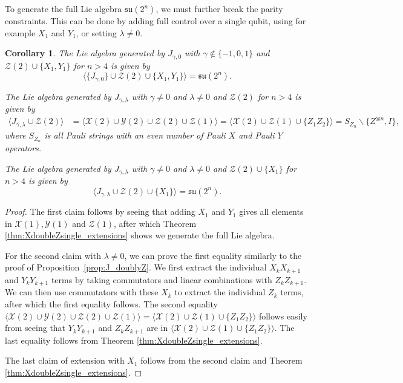 \documentclass[12pt, a4-paper]{amsart}
\newcommand{\cX}{\mathcal{X}}
\newcommand{\cY}{\mathcal{Y}}
\newcommand{\cZ}{\mathcal{Z}}
\numberwithin{equation}{section}
\newtheorem{cor}[lemma]{Corollary}
\begin{document}
To generate the full Lie algebra $\mathfrak{su}(2^n)$, we must further break the parity constraints. This can be done by adding full control over a single qubit, using for example $X_1$ and $Y_1$, or setting $\lambda \neq 0$.

\begin{cor}\label{cor:Ising-Zdouble} 
The Lie algebra generated by $J_{\gamma, 0}$ with $\gamma \notin \{-1,0,1\}$ and $\cZ(2) \cup \{X_1, Y_1\}$ for $n>4$ is given by
    \begin{equation}
        \langle \{J_{\gamma,0}\} \cup \cZ(2) \cup \{X_1, Y_1 \} \rangle = \mathfrak{su}(2^n).
    \end{equation}

The Lie algebra generated by $J_{\gamma, \lambda}$ with $\gamma \neq 0$ and $\lambda \neq 0$ and $\cZ(2)$ for $n>4$ is given by
    \begin{equation}
    \begin{aligned}
        \langle J_{\gamma, \lambda} \cup \cZ(2) \rangle &= \langle \cX(2) \cup \cY(2) \cup \cZ(2) \cup \cZ(1) \rangle =\langle \cX(2) \cup \cZ(1) \cup \{Z_1 Z_2\} \rangle = S_{Z_n}\backslash \{Z^{\otimes n}, I\},
    \end{aligned}
    \end{equation}
    where $S_{Z_n}$ is all Pauli strings with an even number of Pauli $X$ and Pauli $Y$ operators. 

The Lie algebra generated by $J_{\gamma, \lambda}$ with $\gamma \neq 0$ and $\lambda \neq 0$ and $\cZ(2) \cup \{X_1\}$ for $n>4$ is given by
    \begin{equation}
        \langle J_{\gamma, \lambda} \cup \cZ(2) \cup \{X_1\}\rangle =\mathfrak{su}(2^n).
    \end{equation}
\end{cor}
\begin{proof}
    The first claim follows by seeing that adding $X_1$ and $Y_1$ gives all elements in $\cX(1), \cY(1)$ and $\cZ(1)$, after which Theorem \ref{thm:XdoubleZsingle_extensions} shows we generate the full Lie algebra.

    For the second claim with $\lambda \neq 0$, we can prove the first equality similarly to the proof of Proposition~\ref{prop:J_doublyZ}. We first extract the individual $X_k X_{k+1}$ and $Y_k Y_{k+1}$ terms by taking commutators and linear combinations with $Z_k Z_{k+1}$. We can then use commutators with these $X_k$ to extract the individual $Z_k$ terms, after which the first equality follows. The second equality $ \langle \cX(2) \cup \cY(2) \cup \cZ(2) \cup \cZ(1) \rangle =\langle \cX(2) \cup \cZ(1) \cup \{Z_1 Z_2\} \rangle$ follows easily from seeing that $Y_k Y_{k+1}$ and $Z_k Z_{k+1}$ are in $\langle \cX(2) \cup \cZ(1) \cup \{Z_1 Z_2\} \rangle$. The last equality follows from Theorem \ref{thm:XdoubleZsingle_extensions}.

    The last claim of extension with $X_1$ follows from the second claim and Theorem \ref{thm:XdoubleZsingle_extensions}.
\end{proof}
\end{document}
